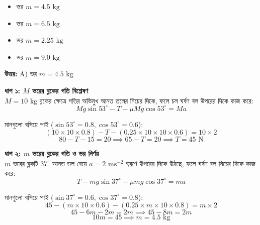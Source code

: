 \documentclass[12pt, a4paper]{article}
\begin{document}
\begin{itemize}[label={}, leftmargin=1cm, itemsep=0.5em]
    \item[\textbf{A)}] ভর $m = 4.5\text{ kg}$
    \item[\textbf{B)}] ভর $m = 6.5\text{ kg}$
    \item[\textbf{C)}] ভর $m = 2.25\text{ kg}$
    \item[\textbf{D)}] ভর $m = 9.0\text{ kg}$
\end{itemize}

\vspace{0.5em}
\begin{tcolorbox}[answerbox]
    \textbf{\color{success} উত্তর:} A) ভর $m = 4.5\text{ kg}$
\end{tcolorbox}
\vspace{1em}

\begin{tcolorbox}[solutionbox={সমাধান (Solution)}]
    \noindent
    \textbf{ধাপ ১: $M$ ভরের ব্লকের গতি বিশ্লেষণ} \\
    $M = 10\text{ kg}$ ব্লকের ক্ষেত্রে গতির অভিমুখ আনত তলের নিচের দিকে, ফলে চল ঘর্ষণ বল উপরের দিকে কাজ করে:
    \[ Mg \sin 53^\circ - T - \mu Mg \cos 53^\circ = M a \]
    
    মানগুলো বসিয়ে পাই ($\sin 53^\circ = 0.8, \cos 53^\circ = 0.6$):
    \[ (10 \times 10 \times 0.8) - T - (0.25 \times 10 \times 10 \times 0.6) = 10 \times 2 \]
    \[ 80 - T - 15 = 20 \implies 65 - T = 20 \implies T = 45\text{ N} \]
    
    \vspace{0.5em}
    \noindent\textbf{ধাপ ২: $m$ ভরের ব্লকের গতি ও ভর নির্ণয়} \\
    $m$ ভরের ব্লকটি $37^\circ$ আনত তল বেয়ে $a = 2\text{ ms}^{-2}$ ত্বরণে উপরের দিকে উঠছে, ফলে ঘর্ষণ বল নিচের দিকে কাজ করে:
    \[ T - mg \sin 37^\circ - \mu mg \cos 37^\circ = m a \]
    
    মানগুলো বসিয়ে পাই ($\sin 37^\circ = 0.6, \cos 37^\circ = 0.8$):
    \[ 45 - (m \times 10 \times 0.6) - (0.25 \times m \times 10 \times 0.8) = m \times 2 \]
    \[ 45 - 6m - 2m = 2m \implies 45 - 8m = 2m \]
    \[ 10m = 45 \implies m = \mathbf{4.5}\text{ kg} \]
\end{tcolorbox}

\newpage
\end{document}
